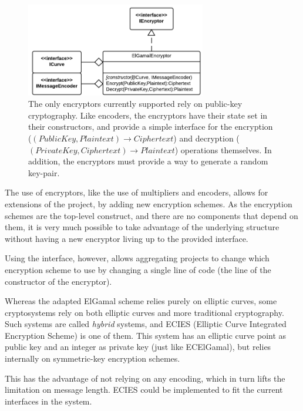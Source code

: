 \begin{figure}[htb]
	\centering
	\includegraphics[width=0.7\textwidth]{implementation/encryptors}
	\caption{The only encryptors currently supported rely on public-key cryptography. Like encoders, the encryptors have their state set
		in their constructors, and provide a simple interface for the encryption (\((PublicKey,Plaintext) \to Ciphertext\)) and decryption
		(\((PrivateKey,Ciphertext) \to Plaintext\)) operations themselves. In addition, the encryptors must provide a way to generate a
		random key-pair.}
\end{figure}

The use of encryptors, like the use of multipliers and encoders, allows for extensions of the project, by adding new encryption schemes.
As the encryption schemes are the top-level construct, and there are no components that depend on them, it is very much possible to take
advantage of the underlying structure without having a new encryptor living up to the provided interface.

Using the interface, however, allows aggregating projects to change which encryption scheme to use by changing a single line of code (the
line of the constructor of the encryptor).

Whereas the adapted ElGamal scheme relies purely on elliptic curves, some cryptosystems rely on both elliptic curves and more traditional
cryptography. Such systems are called \emph{hybrid} systems, and ECIES (Elliptic Curve Integrated Encryption Scheme) is one of them. This
system has an elliptic curve point as public key and an integer as private key (just like ECElGamal), but relies internally on symmetric-key
encryption schemes.\cite{hankerson2010}

This has the advantage of not relying on any encoding, which in turn lifts the limitation on message length. ECIES could be implemented to
fit the current interfaces in the system.